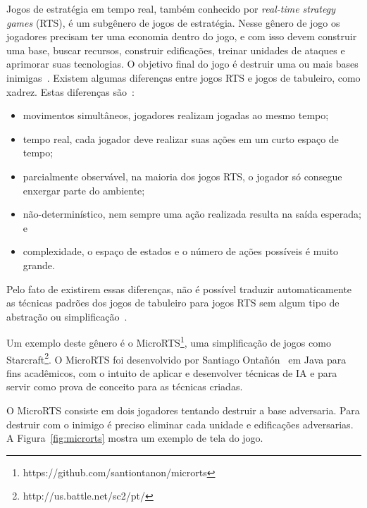 Jogos de estratégia em tempo real, também conhecido por \textit{real-time strategy games} (RTS), é um subgênero de jogos de estratégia. 
Nesse gênero de jogo os jogadores precisam ter uma economia dentro do jogo, e com isso devem construir uma base, buscar recursos, construir edificações, treinar unidades de ataques e aprimorar suas tecnologias. 
O objetivo final do jogo é destruir uma ou mais bases inimigas~\cite{ontanon2013survey, buro2012real}. 
Existem algumas diferenças entre jogos RTS e jogos de tabuleiro, como xadrez. Estas diferenças são~\cite{ontanon2013survey}:
\begin{itemize}
	\item movimentos simultâneos, jogadores realizam jogadas ao mesmo tempo;
	\item tempo real, cada jogador deve realizar suas ações em um curto espaço de tempo;
	\item parcialmente observável, na maioria dos jogos RTS, o jogador só consegue enxergar parte do ambiente;
	\item não-determinístico, nem sempre uma ação realizada resulta na saída esperada; e
	\item complexidade, o espaço de estados e o número de ações possíveis é muito grande.
\end{itemize} 
Pelo fato de existirem essas diferenças, não é possível traduzir automaticamente as técnicas padrões dos jogos de tabuleiro para jogos RTS sem algum tipo de abstração ou simplificação~\cite{ontanon2013survey}.

Um exemplo deste gênero é o MicroRTS\footnote{https://github.com/santiontanon/microrts}, uma simplificação de jogos como Starcraft\footnote{http://us.battle.net/sc2/pt/}. 
O MicroRTS foi desenvolvido por Santiago Ontañón~\cite{ontanon2013combinatorial} em Java para fins acadêmicos, com o intuito de aplicar e desenvolver técnicas de IA e para servir como prova de conceito para as técnicas criadas.

O MicroRTS consiste em dois jogadores tentando destruir a base adversaria. 
Para destruir com o inimigo é preciso eliminar cada unidade e edificações adversarias. 
A Figura~\ref{fig:microrts} mostra um exemplo de tela do jogo.

